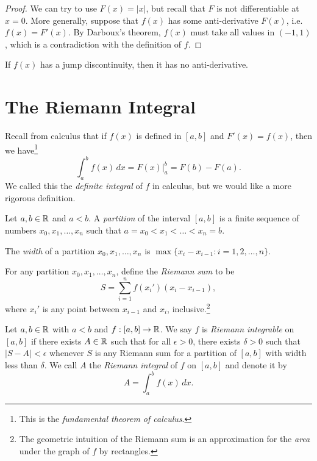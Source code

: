 \begin{proof}
  We can try to use $F(x) = |x|$, but recall that $F$ is
  not differentiable at $x = 0$. More generally, suppose
  that $f(x)$ has some anti-derivative $F(x)$, i.e.
  $f(x) = F'(x)$. By Darboux's theorem, $f(x)$ must
  take all values in $(-1, 1)$, which is a contradiction
  with the definition of $f$.
\end{proof}

\begin{remark}
  If $f(x)$ has a jump discontinuity, then it has no
  anti-derivative.
\end{remark}

\section{The Riemann Integral}
Recall from calculus that if $f(x)$ is defined in
$[a, b]$ and $F'(x) = f(x)$, then we have\footnote{This is the \emph{fundamental theorem of calculus}.}
\[
  \int_a^b f(x)\, dx = F(x) \Big|_a^b = F(b) - F(a).
\]
We called this the \emph{definite integral} of $f$ in
calculus, but we would like a more rigorous definition.

\begin{definition}
  Let $a, b \in \mathbb{R}$ and $a < b$. A \emph{partition} of
  the interval $[a, b]$ is a finite sequence of
  numbers $x_0, x_1, \dots, x_n$ such that
  $a = x_0 < x_1 < \dots < x_n = b$.
\end{definition}

\begin{definition}
  The \emph{width} of a partition $x_0, x_1 , \dots, x_n$ is
  $\max\{x_i - x_{i - 1} : i = 1, 2, \dots, n\}$.
\end{definition}

\begin{definition}
  For any partition $x_0, x_1, \dots, x_n$, define the
  \emph{Riemann sum} to be
  \[
    S = \sum_{i = 1}^n f(x_i') (x_i - x_{i - 1}),
  \]
  where $x_i'$ is any point between $x_{i - 1}$ and
  $x_i$, inclusive.\footnote{The geometric intuition of the Riemann sum is an approximation for the \emph{area} under the graph of $f$ by rectangles.}
\end{definition}

\begin{definition}
  Let $a, b \in \mathbb{R}$ with $a < b$ and $f : [a, b] \to \mathbb{R}$.
  We say $f$ is \emph{Riemann integrable} on $[a, b]$ if
  there exists $A \in \mathbb{R}$ such that for all
  $\epsilon > 0$, there exists $\delta > 0$ such that
  $|S - A| < \epsilon$ whenever $S$ is any Riemann
  sum for a partition of $[a, b]$ with width less than
  $\delta$. We call $A$ the \emph{Riemann integral} of
  $f$ on $[a, b]$ and denote it by
  \[
    A = \int_a^b f(x)\, dx.
  \]
\end{definition}

